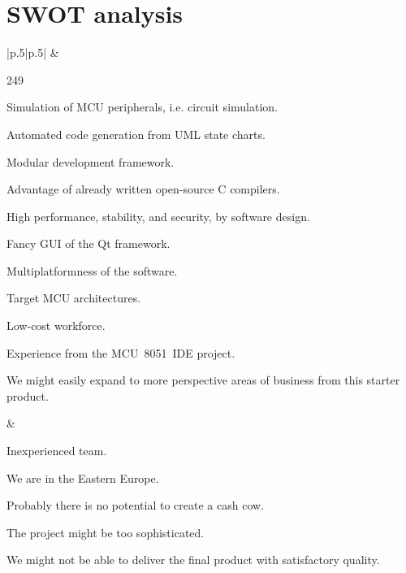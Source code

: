 \documentclass[a4paper,twoside,15pt]{book}
\begin{document}
    \section{SWOT analysis}
        \begin{table}[h!]
            \centering{}
            \begin{tabular}{|p{}|p{}|}
                    &  \\

                \begin{dinglist}{249}
                    \setlength{\itemsep}{-3pt}
                    \item Simulation of MCU peripherals, i.e. circuit simulation.
                    \item Automated code generation from UML state charts.
                    \item Modular development framework.
                    \item Advantage of already written open-source C compilers.
                    \item High performance, stability, and security, by software design.
                    \item Fancy GUI of the Qt framework.
                    \item Multiplatformness of the software.
                    \item Target MCU architectures.
                    \item Low-cost workforce.
                    \item Experience from the MCU~8051~IDE project.
                    \item We might easily expand to more perspective areas of business from this starter product.
                \end{dinglist}  &

                \begin{dinglist}{74}
                    \setlength{\itemsep}{-3pt}
                    \item Inexperienced team.
                    \item We are in the Eastern Europe.
                    \item Probably there is no potential to create a cash cow.
                    \item The project might be too sophisticated.
                    \item We might not be able to deliver the final product with satisfactory quality.
                \end{dinglist}  \\


\end{tabular}
\end{table}
\end{document}
